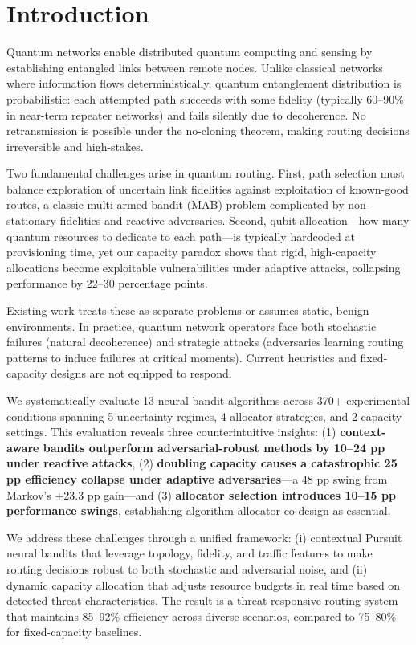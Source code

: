 \documentclass[11pt,a4paper]{article}
\begin{document}
\section{Introduction}
\label{sec:introduction}

Quantum networks enable distributed quantum computing and sensing by establishing entangled links between remote nodes. Unlike classical networks where information flows deterministically, quantum entanglement distribution is probabilistic: each attempted path succeeds with some fidelity (typically 60--90\% in near-term repeater networks) and fails silently due to decoherence. No retransmission is possible under the no-cloning theorem, making routing decisions irreversible and high-stakes.

Two fundamental challenges arise in quantum routing. First, path selection must balance exploration of uncertain link fidelities against exploitation of known-good routes, a classic multi-armed bandit (MAB) problem complicated by non-stationary fidelities and reactive adversaries. Second, qubit allocation—how many quantum resources to dedicate to each path—is typically hardcoded at provisioning time, yet our capacity paradox shows that rigid, high-capacity allocations become exploitable vulnerabilities under adaptive attacks, collapsing performance by 22--30 percentage points.

Existing work treats these as separate problems or assumes static, benign environments. In practice, quantum network operators face both stochastic failures (natural decoherence) and strategic attacks (adversaries learning routing patterns to induce failures at critical moments). Current heuristics and fixed-capacity designs are not equipped to respond.

We systematically evaluate 13 neural bandit algorithms across 370+ experimental conditions spanning 5 uncertainty regimes, 4 allocator strategies, and 2 capacity settings. This evaluation reveals three counterintuitive insights: (1) \textbf{context-aware bandits outperform adversarial-robust methods by 10--24 pp under reactive attacks}, (2) \textbf{doubling capacity causes a catastrophic 25 pp efficiency collapse under adaptive adversaries}—a 48 pp swing from Markov's +23.3 pp gain—and (3) \textbf{allocator selection introduces 10--15 pp performance swings}, establishing algorithm-allocator co-design as essential.

We address these challenges through a unified framework: (i) contextual Pursuit neural bandits that leverage topology, fidelity, and traffic features to make routing decisions robust to both stochastic and adversarial noise, and (ii) dynamic capacity allocation that adjusts resource budgets in real time based on detected threat characteristics. The result is a threat-responsive routing system that maintains 85--92\% efficiency across diverse scenarios, compared to 75--80\% for fixed-capacity baselines.
\end{document}

